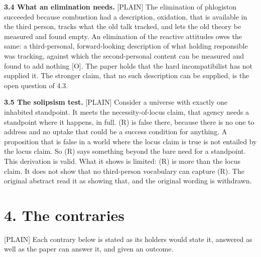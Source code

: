 \documentclass[11pt]{article}
\newcommand{\register}[1]{{\ttfamily\small #1}}
\begin{document}
\textbf{3.4 What an elimination needs.} \register{[PLAIN]} The elimination of phlogiston succeeded because combustion had a description, oxidation, that is available in the third person, tracks what the old talk tracked, and lets the old theory be measured and found empty. An elimination of the reactive attitudes owes the same: a third-personal, forward-looking description of what holding responsible was tracking, against which the second-personal content can be measured and found to add nothing [O]. The paper holds that the hard incompatibilist has not supplied it. The stronger claim, that no such description can be supplied, is the open question of 4.3.

\textbf{3.5 The solipsism test.} \register{[PLAIN]} Consider a universe with exactly one inhabited standpoint. It meets the necessity-of-locus claim, that agency needs a standpoint where it happens, in full. (R) is false there, because there is no one to address and no uptake that could be a success condition for anything. A proposition that is false in a world where the locus claim is true is not entailed by the locus claim. So (R) says something beyond the bare need for a standpoint. This derivation is valid. What it shows is limited: (R) is more than the locus claim. It does not show that no third-person vocabulary can capture (R). The original abstract read it as showing that, and the original wording is withdrawn.

\section*{4. The contraries}

\register{[PLAIN]} Each contrary below is stated as its holders would state it, answered as well as the paper can answer it, and given an outcome.
\end{document}
